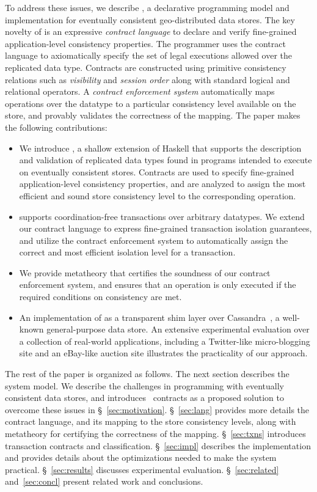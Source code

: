 To address these issues, we describe \name, a declarative programming model
and implementation for eventually consistent geo-distributed data
stores. The key novelty of \name is an expressive \emph{contract language}
to declare and verify fine-grained application-level consistency
properties. The programmer uses the contract language to axiomatically
specify the set of legal executions allowed over the replicated data
type. Contracts are constructed using primitive consistency relations such
as \emph{visibility} and \emph{session order} along with standard logical
and relational operators. A \emph{contract enforcement system} automatically
maps operations over the datatype to a particular consistency level
available on the store, and provably validates the correctness of the
mapping.  The paper makes the following contributions:

\begin{itemize}
\setlength{\itemsep}{2pt}
\item We introduce \name, a shallow extension of Haskell that supports the description
  and validation of replicated data types found in programs intended to
  execute on eventually consistent stores. Contracts are used to specify
  fine-grained application-level consistency properties, and are analyzed to
  assign the most efficient and sound store consistency level to the
  corresponding operation.
\item \name supports coordination-free transactions over arbitrary datatypes.
	We extend our contract language to express fine-grained transaction isolation
	guarantees, and utilize the contract enforcement system to automatically
	assign the correct and most efficient isolation level for a transaction.
\item We provide metatheory that certifies the soundness of our contract
	enforcement system, and ensures that an operation is only executed if the
	required conditions on consistency are met.
\item An implementation of \name as a transparent shim layer over
	Cassandra~\cite{Cassandra}, a well-known general-purpose data store.  An
	extensive experimental evaluation over a collection of real-world
	applications, including a Twitter-like micro-blogging site and an eBay-like
	auction site illustrates the practicality of our approach.
\end{itemize}

The rest of the paper is organized as follows. The next section describes the
system model.  We describe the challenges in programming with eventually
consistent data stores, and introduces \name\ contracts as a proposed solution
to overcome these issues in \S~\ref{sec:motivation}. \S~\ref{sec:lang} provides
more details the contract language, and its mapping to the store consistency
levels, along with metatheory for certifying the correctness of the mapping.
\S~\ref{sec:txns} introduces transaction contracts and classification.
\S~\ref{sec:impl} describes the implementation and provides details about the
optimizations needed to make the system practical. \S~\ref{sec:results}
discusses experimental evaluation. \S~\ref{sec:related} and~\ref{sec:concl}
present related work and conclusions.
